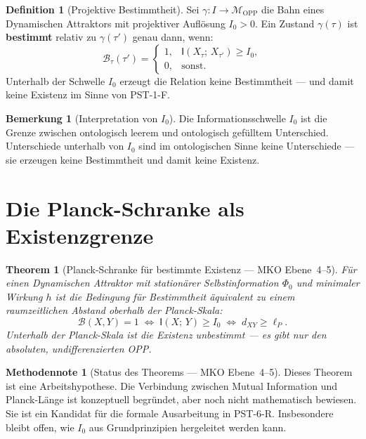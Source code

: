 \documentclass[11pt,a4paper]{article}
\theoremstyle{plain}
\newtheorem{theorem}{Theorem}[section]
\theoremstyle{definition}
\newtheorem{definition}{Definition}[section]
\newtheorem{remark}{Bemerkung}[section]
\newtheorem{methodennote}{Methodennote}[section]
\newcommand{\OPP}{\mathcal{M}_{\mathrm{OPP}}}
\newcommand{\MI}[2]{\mathsf{I}(#1;\,#2)}
\begin{document}
\begin{definition}[Projektive Bestimmtheit]
Sei $\gamma\colon I \to \OPP$ die Bahn eines Dynamischen Attraktors mit
projektiver Aufl\"{o}sung $I_0 > 0$. Ein Zustand $\gamma(\tau)$ ist
\textbf{bestimmt} relativ zu $\gamma(\tau')$ genau dann, wenn:
\[
  \mathcal{B}_\tau(\tau') =
  \begin{cases}
    1, & \MI{X_\tau}{X_{\tau'}} \geq I_0,\\
    0, & \text{sonst.}
  \end{cases}
\]
Unterhalb der Schwelle $I_0$ erzeugt die Relation keine Bestimmtheit ---
und damit keine Existenz im Sinne von PST-1-F.
\end{definition}

\begin{remark}[Interpretation von $I_0$]
Die Informationsschwelle $I_0$ ist die Grenze zwischen ontologisch leerem
und ontologisch gef\"{u}lltem Unterschied. Unterschiede unterhalb von $I_0$
sind im ontologischen Sinne keine Unterschiede --- sie erzeugen keine
Bestimmtheit und damit keine Existenz.
\end{remark}

\section{Die Planck-Schranke als Existenzgrenze}

\begin{theorem}[Planck-Schranke f\"{u}r bestimmte Existenz ---
MKO Ebene~4--5]
F\"{u}r einen Dynamischen Attraktor mit station\"{a}rer Selbstinformation
$\Phi_0$ und minimaler Wirkung $h$ ist die Bedingung f\"{u}r Bestimmtheit
\"{a}quivalent zu einem raumzeitlichen Abstand oberhalb der Planck-Skala:
\[
  \mathcal{B}(X,Y) = 1
  \;\Longleftrightarrow\;
  \MI{X}{Y} \geq I_0
  \;\Longleftrightarrow\;
  d_{XY} \geq \ell_P.
\]
Unterhalb der Planck-Skala ist die Existenz unbestimmt --- es gibt nur
den absoluten, undifferenzierten OPP.
\end{theorem}

\begin{methodennote}[Status des Theorems --- MKO Ebene~4--5]
Dieses Theorem ist eine Arbeitshypothese. Die Verbindung zwischen Mutual
Information und Planck-L\"{a}nge ist konzeptuell begr\"{u}ndet, aber noch
nicht mathematisch bewiesen. Sie ist ein Kandidat f\"{u}r die formale
Ausarbeitung in PST-6-R. Insbesondere bleibt offen, wie $I_0$ aus
Grundprinzipien hergeleitet werden kann.
\end{methodennote}
\end{document}
